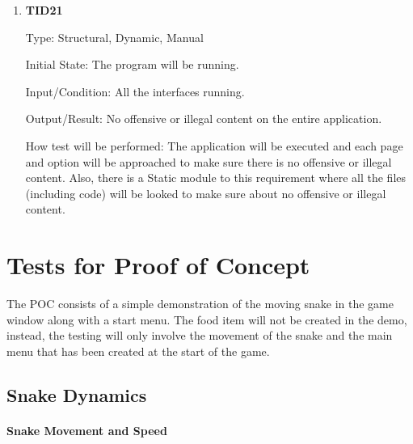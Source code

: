 \documentclass[12pt, titlepage]{article}
\begin{document}
\begin{enumerate}
	
	\item{\textbf{TID21}\\}
	
	Type:  Structural, Dynamic, Manual
	
	Initial State: The program will be running.
	
	Input/Condition: All the interfaces running.
	
	Output/Result: No offensive or illegal content on the entire application.
	
	How test will be performed: The application will be executed and each page and option will be approached to make sure there is no offensive or illegal content. Also, there is a Static module to this requirement where all the files (including code) will be looked to make sure about no offensive or illegal content.
	
\end{enumerate}

\section{Tests for Proof of Concept}

The POC consists of a simple demonstration of the moving snake in the game window along with a start menu. The food item will not be created in the demo, instead, the testing will only involve the movement of the snake and the main menu that has been created at the start of the game.

\subsection{Snake Dynamics}
		
\paragraph{Snake Movement and Speed}
\end{document}
